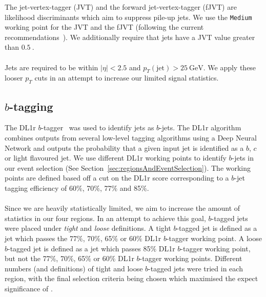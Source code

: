  The jet-vertex-tagger (JVT) and the forward jet-vertex-tagger (fJVT) are likelihood discriminants which aim to suppress pile-up jets. We use the \texttt{Medium} working point for the JVT and the fJVT (following the current recommendations~\cite{JVTandfJVT-Recommendations}). We additionally require that jets have a JVT value greater than $\SI{0.5}{}$.\\\\
 
Jets are required to be within $|\eta| < 2.5$ and $p_{T}(\text{jet}) > \SI{25}{\GeV}$. We apply these looser $p_T$ cuts in an attempt to increase our limited signal statistics.



\subsection{$b$-tagging}
The DL1r $b$-tagger~\cite{DL1r-paper} was used to identify jets as $b$-jets. The DL1r algorithm combines outputs from several low-level tagging algorithms using a Deep Neural Network and outputs the probability that a given input jet is identified as a $b$, $c$ or light flavoured jet. We use different DL1r working points to identify $b$-jets in our event selection (See Section~\ref{sec:regionsAndEventSelection}). The working points are defined based off a cut on the DL1r score corresponding to a $b$-jet tagging efficiency of 60$\%$, 70$\%$, 77$\%$ and 85$\%$. \\\\
Since we are heavily statistically limited, we aim to increase the amount of statistics in our four regions. In an attempt to achieve this goal, $b$-tagged jets were placed under \textit{tight} and \textit{loose} definitions. A tight $b$-tagged jet is defined as a jet which passes the 77$\%$, 70$\%$, 65$\%$ or 60$\%$ DL1r $b$-tagger working point. A loose $b$-tagged jet is defined as a jet which passes 85$\%$ DL1r $b$-tagger working point, but not the 77$\%$, 70$\%$, 65$\%$ or 60$\%$ DL1r $b$-tagger working points. Different numbers (and definitions) of tight and loose $b$-tagged jets were tried in each region, with the final selection criteria being chosen which maximised the expect significance of \tWZ.

